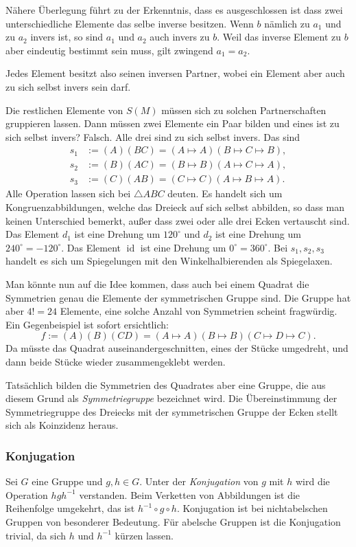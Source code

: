 \documentclass[a4paper,11pt,fleqn,twoside]{scrartcl}
\numberwithin{equation}{section}
\newcommand{\id}{\operatorname{id}}
\theoremstyle{rmbox}
\newcommand{\emdef}[1]{\emph{#1}}
\begin{document}
Nähere Überlegung führt zu der Erkenntnis, dass es ausgeschlossen
ist dass zwei unterschiedliche Elemente das selbe inverse besitzen.
Wenn $b$ nämlich
zu $a_1$ und zu $a_2$ invers ist, so sind $a_1$ und $a_2$ auch invers
zu $b$. Weil das inverse Element zu $b$ aber eindeutig bestimmt sein
muss, gilt zwingend $a_1=a_2$.

Jedes Element besitzt also seinen inversen Partner,
wobei ein Element aber auch zu sich selbst invers sein darf.

Die restlichen Elemente von $S(M)$ müssen sich zu solchen
Partnerschaften gruppieren lassen. Dann müssen zwei Elemente
ein Paar bilden und eines ist zu sich selbst invers? Falsch.
Alle drei sind zu sich selbst invers. Das sind
\begin{align}\label{eq:Spiegelung1}
s_1&:= (A)(BC) = (A\mapsto A)(B\mapsto C\mapsto B),\\
s_2&:= (B)(AC) = (B\mapsto B)(A\mapsto C\mapsto A),\\
s_3&:= (C)(AB) = (C\mapsto C)(A\mapsto B\mapsto A).
\end{align}
Alle Operation lassen sich bei $\triangle ABC$ deuten.
Es handelt sich um Kongruenzabbildungen, welche das Dreieck
auf sich selbst abbilden, so dass man keinen Unterschied
bemerkt, außer dass zwei oder alle drei Ecken vertauscht sind.
Das Element $d_1$ ist eine Drehung um $120^\circ$ und $d_2$ ist
eine Drehung um $240^\circ = -120^\circ$. Das Element $\id$
ist eine Drehung um $0^\circ = 360^\circ$. Bei $s_1,s_2,s_3$
handelt es sich um Spiegelungen mit den Winkelhalbierenden
als Spiegelaxen.

Man könnte nun auf die Idee kommen, dass auch bei einem Quadrat
die Symmetrien genau die Elemente der symmetrischen Gruppe sind.
Die Gruppe hat aber $4!=24$ Elemente, eine solche Anzahl von
Symmetrien scheint fragwürdig. Ein Gegenbeispiel ist sofort
ersichtlich:
\begin{equation}
f := (A)(B)(CD) = (A\mapsto A)(B\mapsto B)(C\mapsto D\mapsto C).
\end{equation}
Da müsste das Quadrat auseinandergeschnitten, eines der Stücke
umgedreht, und dann beide Stücke wieder zusammengeklebt werden.

Tatsächlich bilden die Symmetrien des Quadrates aber eine Gruppe,
die aus diesem Grund als \emph{Symmetriegruppe} bezeichnet wird.
Die Übereinstimmung der Symmetriegruppe des Dreiecks mit der
symmetrischen Gruppe der Ecken stellt sich als Koinzidenz heraus.

\subsubsection{Konjugation}
Sei $G$ eine Gruppe und $g,h\in G$. Unter der \emdef{Konjugation}
von $g$ mit $h$ wird die Operation $hgh^{-1}$ verstanden. Beim
Verketten von Abbildungen ist die Reihenfolge umgekehrt, das ist
$h^{-1}\circ g\circ h$. Konjugation ist bei nichtabelschen Gruppen
von besonderer Bedeutung. Für abelsche Gruppen ist die Konjugation
trivial, da sich $h$ und $h^{-1}$ kürzen lassen.
\end{document}
